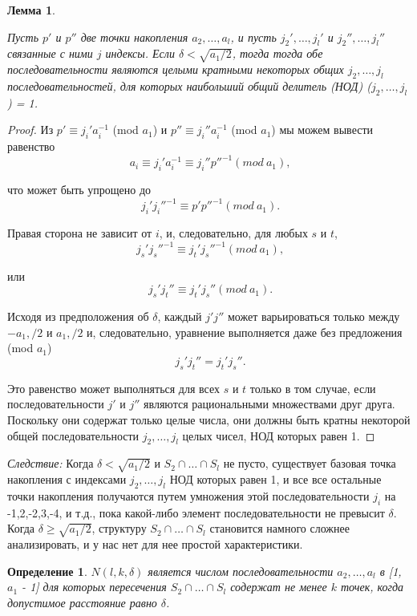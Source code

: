 \documentclass[a4paper,12pt]{report}
\newtheorem{Лемма}{Лемма}
\newtheorem{Определение}{Определение}
\begin{document}
\begin{Лемма}
\hypertarget{лемма2}{}
Пусть $p'$ и $p''$ две точки накопления $a_2, \ldots, a_l$, и пусть $j_2', \ldots, j_l'$ и $j_2'', \ldots, j_l''$ связанные с ними $j$ индексы. Если $\delta < \sqrt{a_1/2}$, тогда тогда обе последовательности являются целыми кратными некоторых общих $j_2,\ldots, j_l$ последовательностей, для которых наибольший общий делитель (НОД) ($j_2,\ldots, j_l$) = 1.
\end{Лемма}

\begin{proof}
Из $p' \equiv j_i' a_i^{-1}$ (mod $a_1$) и $p'' \equiv j_i''a_i^{-1}$ (mod $a_1$) мы можем вывести равенство
\[
\ a_i \equiv j_i' a_i^{-1} \equiv j_i'' p''^{-1}(mod \ a_1),
\]

\noindent что может быть упрощено до 
\[
\ j_i' j_i''^{-1} \equiv p' p''^{-1}(mod \ a_1).
\]

\noindent Правая сторона не зависит от $i$, и, следовательно, для любых $s$ и $t$,
\[
\ j_s' j_s''^{-1} \equiv j_t' j_s''^{-1}(mod \ a_1),
\]

\noindent или
\[
\ j_s' j_t'' \equiv j_t' j_s''(mod \ a_1).
\]


\noindent Исходя из предположения об $\delta$, каждый $j'j''$ может варьироваться только между $-a_1,/2$ и $a_1,/2$ и, следовательно, уравнение выполняется даже без предложения (mod $a_1$)
\[
\ j_s' j_t'' = j_t' j_s''.
\]

Это равенство может выполняться для всех $s$ и $t$ только в том случае, если последовательности $j'$ и $j''$ являются рациональными множествами друг друга. Поскольку они содержат только целые числа, они должны быть кратны некоторой общей последовательности $j_2, \ldots, j_l$ целых чисел, НОД которых равен 1.
\end{proof}

\textit{Следствие:} Когда $\delta < \sqrt{a_1 / 2}$ и $S_2 \cap \ldots \cap S_l$ не пусто, существует базовая точка накопления с индексами $j_2, \ldots, j_l$ НОД которых равен 1, и все все остальные точки накопления получаются путем умножения этой последовательности $j_i$ на -1,2,-2,3,-4, и т.д., пока какой-либо элемент последовательности не превысит $\delta$. Когда $\delta \geq \sqrt{a_1/2}$, структуру $S_2 \cap \ldots \cap S_l$ становится намного сложнее анализировать, и у нас нет для нее простой характеристики.

\begin{Определение}
$N(l,k,\delta)$ является числом последовательности $a_2, \ldots, a_l$ в [1, $a_1$ - 1] для которых пересечения $S_2 \cap \ldots \cap S_l$ содержат не менее $k$ точек, когда допустимое расстояние равно $\delta$.
\end{Определение}
\end{document}
